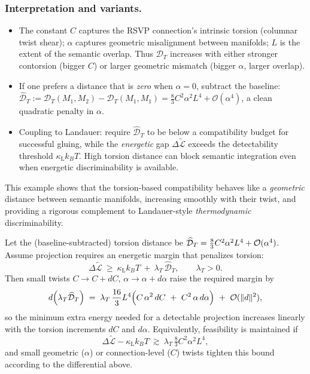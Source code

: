 \documentclass[a4paper,11pt]{article}
\begin{document}
\subsubsection{Interpretation and variants.}
\begin{itemize}
\item The constant $C$ captures the RSVP connection’s intrinsic torsion (columnar
twist shear); $\alpha$ captures geometric misalignment between manifolds; $L$
is the extent of the semantic overlap. Thus $\mathcal{D}_T$ increases with
either stronger contorsion (bigger $C$) or larger geometric mismatch (bigger
$\alpha$, larger overlap).
\item If one prefers a distance that is \emph{zero} when $\alpha=0$,
subtract the baseline: $\widehat{\mathcal{D}}_T := \mathcal{D}_T(M_1,M_2)-
\mathcal{D}_T(M_1,M_1)=\tfrac{8}{3}C^2\alpha^2 L^4+\mathcal{O}(\alpha^4)$,
a clean quadratic penalty in $\alpha$.
\item Coupling to Landauer: require $\widehat{\mathcal{D}}_T$ to be below a
compatibility budget for successful gluing, while the \emph{energetic} gap
$\Delta\widetilde{\mathcal{L}}$ exceeds the detectability threshold
$\kappa_{\mathrm{L}}k_B T$. High torsion distance can block semantic
integration even when energetic discriminability is available.
\end{itemize}

This example shows that the torsion-based compatibility behaves like a
\emph{geometric} distance between semantic manifolds, increasing smoothly with
their twist, and providing a rigorous complement to Landauer-style
\emph{thermodynamic} discriminability.

\begin{corollary}
\label{cor:landauer-torsion-coupling}
Let the (baseline-subtracted) torsion distance be
$\widehat{\mathcal{D}}_{T}=\tfrac{8}{3}C^{2}\alpha^{2}L^{4}+{\cal O}(\alpha^{4})$.
Assume projection requires an energetic margin that penalizes torsion:
\begin{equation}
\Delta\widetilde{\mathcal{L}}\ \ge\ \kappa_{\mathrm L} k_B T\ +\ \lambda_{T}\,\widehat{\mathcal{D}}_{T},
\qquad \lambda_{T}>0.
\end{equation}
Then small twists $C\!\to\! C{+}dC$, $\alpha\!\to\!\alpha{+}d\alpha$ raise the
required margin by
\begin{equation}
d\!\left(\lambda_{T}\widehat{\mathcal{D}}_{T}\right)
\;=\;
\lambda_{T}\,\frac{16}{3}L^{4}\Big(C\,\alpha^{2}\,dC\ +\ C^{2}\,\alpha\,d\alpha\Big)
\ +\ {\cal O}(\|d\|^{2}),
\end{equation}
so the minimum extra energy needed for a detectable projection increases linearly
with the torsion increments $dC$ and $d\alpha$. Equivalently, feasibility is
maintained if
\begin{equation}
\Delta\widetilde{\mathcal{L}}-\kappa_{\mathrm L}k_B T
\ \gtrsim\
\lambda_{T}\,\tfrac{8}{3}C^{2}\alpha^{2}L^{4},
\end{equation}
and small geometric (\(\alpha\)) or connection-level (\(C\)) twists tighten this
bound according to the differential above.
\end{corollary}
\end{document}
